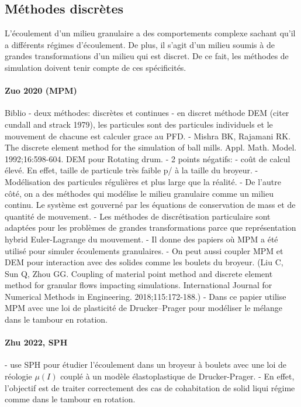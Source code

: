 \subsection{Méthodes discrètes}

L'écoulement d'un milieu granulaire a des comportements complexe sachant qu'il a différents régimes d'écoulement.
De plus, il s'agit d'un milieu soumis à de grandes transformations d'un milieu qui est discret.
De ce fait, les méthodes de simulation doivent tenir compte de ces spécificités.


\paragraph*{Zuo 2020 (MPM)}
Biblio
- deux méthodes: discrètes et continues
- en discret méthode DEM (citer cundall and strack 1979), les particules sont des particules individuels et le mouvement de chacune est calculer grace au PFD.
- Mishra BK, Rajamani RK. The discrete element method for the simulation of ball mills. Appl. Math. Model. 1992;16:598-604. DEM pour Rotating drum.
- 2 points négatifs:
- coût de calcul élevé. En effet, taille de particule très faible p/ à la taille du broyeur.
- Modélisation des particules régulières et plus large que la réalité.
- De l'autre côté, on a des méthodes qui modélise le milieu granulaire comme un milieu continu. Le système est gouverné par les équations de conservation de mass et de quantité de mouvement.
- Les méthodes de discrétisation particulaire sont adaptées pour les problèmes de grandes transformations parce que représentation hybrid Euler-Lagrange du mouvement.
- Il donne des papiers où MPM a été utilisé pour simuler écoulements granulaires.
- On peut aussi coupler MPM et DEM pour interaction avec des solides comme les boulets du broyeur. (Liu C, Sun Q, Zhou GG. Coupling of material point method and discrete element method for granular flows impacting simulations. International Journal for Numerical Methods in Engineering. 2018;115:172-188.)
- Dans ce papier utilise MPM avec une loi de plasticité de Drucker–Prager pour modéliser le mélange dans le tambour en rotation.

\paragraph*{Zhu 2022, SPH}

- use SPH pour étudier l'écoulement dans un broyeur à boulets avec une loi de réologie $\mu (I)$ couplé à un modèle élastoplastique de Drucker-Prager.
- En effet, l'objectif est de traiter correctement des cas de cohabitation de solid liqui régime comme dans le tambour en rotation.

